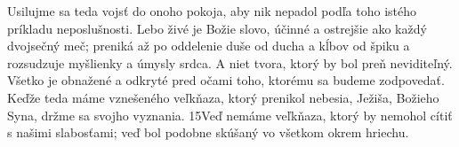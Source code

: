 Usilujme sa teda vojsť do onoho pokoja, aby nik nepadol podľa toho istého príkladu neposlušnosti.
Lebo živé je Božie slovo, účinné a ostrejšie ako každý dvojsečný meč; preniká až po oddelenie duše od ducha a kĺbov od špiku a rozsudzuje myšlienky a úmysly srdca.
A niet tvora, ktorý by bol preň neviditeľný. Všetko je obnažené a odkryté pred očami toho, ktorému sa budeme zodpovedať.
Keďže teda máme vznešeného veľkňaza, ktorý prenikol nebesia, Ježiša, Božieho Syna, držme sa svojho vyznania. 15Veď nemáme veľkňaza, ktorý by nemohol cítiť s našimi slabosťami; veď bol podobne skúšaný vo všetkom okrem hriechu.